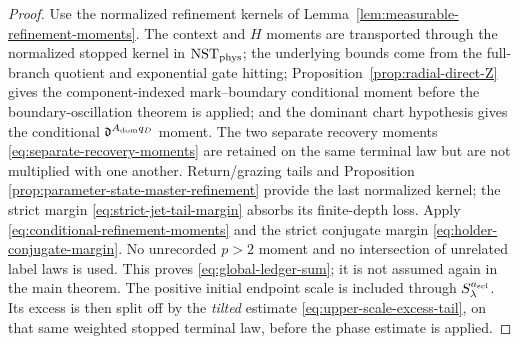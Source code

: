 \documentclass[11pt]{article}
\begin{document}
\begin{proof}
Use the normalized refinement kernels of
Lemma~\ref{lem:measurable-refinement-moments}.  The context and $H$ moments
are transported through the normalized stopped kernel in
$\mathrm{NST}_{\rm phys}$; the underlying bounds come from the full-branch
quotient and exponential gate hitting;
Proposition~\ref{prop:radial-direct-Z} gives the component-indexed
mark--boundary conditional moment before the boundary-oscillation theorem is
applied; and the dominant chart hypothesis gives the conditional
$\mathfrak d^{A_{\rm dom}q_D}$ moment.  The two separate recovery moments
\eqref{eq:separate-recovery-moments} are retained on the same terminal law
but are not multiplied with one another.  Return/grazing tails and Proposition
\ref{prop:parameter-state-master-refinement} provide the last normalized
kernel; the strict margin \eqref{eq:strict-jet-tail-margin} absorbs its
finite-depth loss.  Apply \eqref{eq:conditional-refinement-moments} and the
strict conjugate margin \eqref{eq:holder-conjugate-margin}.  No unrecorded
$p>2$ moment and no intersection of unrelated label laws is used.  This proves
\eqref{eq:global-ledger-sum}; it is not assumed again in the main theorem.
The positive initial endpoint scale is included through
$S_\lambda^{a_{\rm scl}}$.  Its excess is then split off by the
\emph{tilted} estimate \eqref{eq:upper-scale-excess-tail}, on that same
weighted stopped terminal law, before the phase estimate is applied.
\end{proof}
\end{document}
